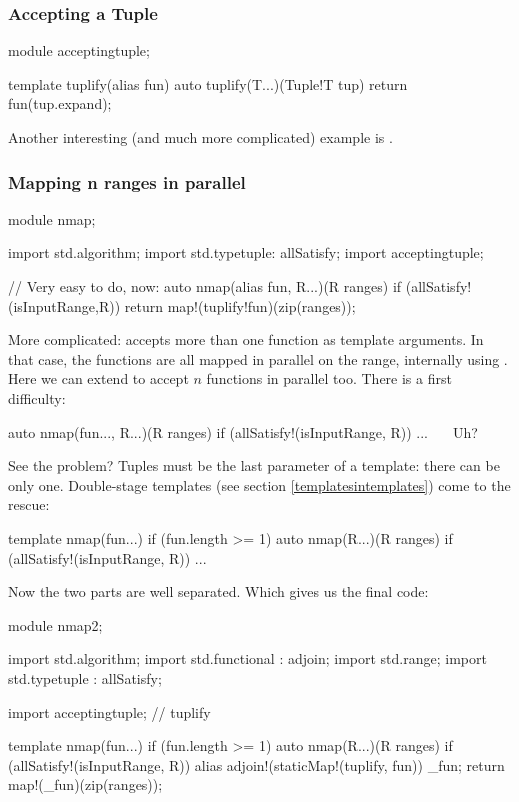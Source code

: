 \subsubsection{Accepting a Tuple}


\begin{dcode}
module acceptingtuple;

template tuplify(alias fun)
{
    auto tuplify(T...)(Tuple!T tup)
    {
        return fun(tup.expand);
    }
}
\end{dcode}

Another interesting (and much more complicated) example is .

\subsubsection{Mapping n ranges in parallel}\label{parallelmapping}

\begin{dcode}
module nmap;

import std.algorithm;
import std.typetuple: allSatisfy;
import acceptingtuple;

// Very easy to do, now:
auto nmap(alias fun, R...)(R ranges) if (allSatisfy!(isInputRange,R))
{
    return map!(tuplify!fun)(zip(ranges));
}
\end{dcode}

More complicated:  accepts more than one function as template arguments. In that case, the functions are all mapped in parallel on the range, internally using .
Here we can extend  to accept $n$ functions in parallel too. There is a first difficulty:

\begin{dcode}
auto nmap(fun..., R...)(R ranges) if (allSatisfy!(isInputRange, R))
{ ... }   ^^^^^^^^^^^^ Uh?
\end{dcode}

See the problem? Tuples must be the last parameter of a template: there can be only one. Double-stage templates (see section \ref{templatesintemplates}) come to the rescue:

\begin{dcode}
template nmap(fun...) if (fun.length >= 1)
{
    auto nmap(R...)(R ranges) if (allSatisfy!(isInputRange, R))
    {...}
}
\end{dcode}

Now the two parts are well separated. Which gives us the final code:

\begin{dcode}
module nmap2;

import std.algorithm;
import std.functional : adjoin;
import std.range;
import std.typetuple : allSatisfy;

import acceptingtuple; // tuplify

template nmap(fun...) if (fun.length >= 1)
{
    auto nmap(R...)(R ranges) if (allSatisfy!(isInputRange, R))
    {
        alias adjoin!(staticMap!(tuplify, fun)) _fun;
        return map!(_fun)(zip(ranges));
    }
}
\end{dcode}

